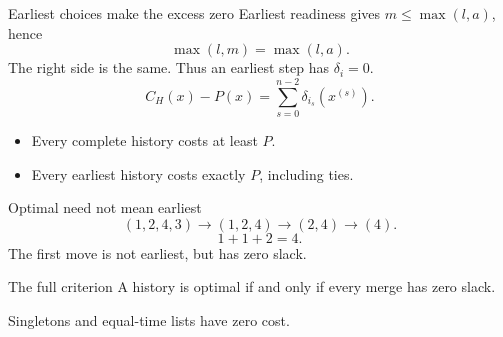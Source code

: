 \documentclass{beamer}
\begin{document}
\begin{frame}{Earliest choices make the excess zero}
Earliest readiness gives $m\leq\max(l,a)$, hence
\[
\max(l,m)=\max(l,a).
\]
The right side is the same. Thus an earliest step has $\delta_i=0$.
\[
C_H(x)-P(x)=\sum_{s=0}^{n-2}\delta_{i_s}(x^{(s)}).
\]
\begin{itemize}
\item Every complete history costs at least $P$.
\item Every earliest history costs exactly $P$, including ties.
\end{itemize}
\end{frame}
\begin{frame}{Optimal need not mean earliest}
\[
(1,2,4,3)\to(1,2,4)\to(2,4)\to(4).
\]
\[
1+1+2=4.
\]
The first move is not earliest, but has zero slack.

\begin{block}{The full criterion}
A history is optimal if and only if every merge has zero slack.
\end{block}
Singletons and equal-time lists have zero cost.
\end{frame}
\end{document}
